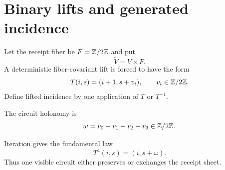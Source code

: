\section{Binary lifts and generated incidence}

Let the receipt fiber be \(F=\mathbb{Z}/2\mathbb{Z}\) and put
\[
\widetilde V=V\times F.
\]
A deterministic fiber-covariant lift is forced to have the form
\[
T(i,s)=(i+1,s+v_i),
\qquad v_i\in\mathbb{Z}/2\mathbb{Z}.
\]
Define lifted incidence by one application of \(T\) or \(T^{-1}\).

\begin{definition}
The circuit holonomy is
\[
\omega=v_0+v_1+v_2+v_3\in\mathbb{Z}/2\mathbb{Z}.
\]
\end{definition}

Iteration gives the fundamental law
\[
T^4(i,s)=(i,s+\omega).
\]
Thus one visible circuit either preserves or exchanges the receipt
sheet.
